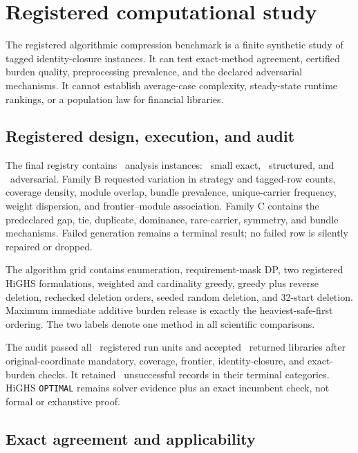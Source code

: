 \section{Registered computational study}
\label{sec:computational-study}
\label{sec:experiments}

The registered algorithmic compression benchmark is a finite synthetic study of
tagged identity-closure instances. It can test exact-method agreement, certified
burden quality, preprocessing prevalence, and the declared adversarial
mechanisms. It cannot establish average-case complexity, steady-state runtime
rankings, or a population law for financial libraries.

\subsection{Registered design, execution, and audit}

The final registry contains \AORBenchmarkInstances\ analysis instances:
\AORBenchmarkSmallExact\ small exact, \AORBenchmarkStructured\ structured,
and \AORBenchmarkAdversarial\ adversarial. Family B requested variation in
strategy and tagged-row counts, coverage density, module overlap, bundle
prevalence, unique-carrier frequency, weight dispersion, and
frontier--module association. Family C contains the predeclared gap, tie,
duplicate, dominance, rare-carrier, symmetry, and bundle mechanisms. Failed
generation remains a terminal result; no failed row is silently repaired or
dropped.

The algorithm grid contains enumeration, requirement-mask DP, two registered
HiGHS formulations, weighted and cardinality greedy, greedy plus reverse
deletion, rechecked deletion orders, seeded random deletion, and 32-start
deletion. Maximum immediate additive burden release is exactly the
heaviest-safe-first ordering. The two labels denote one method in all scientific comparisons.

The audit passed all \AORBenchmarkRuns\ registered run units and accepted
\AORBenchmarkAccepted\ returned libraries after original-coordinate mandatory,
coverage, frontier, identity-closure, and exact-burden checks. It retained
\AORBenchmarkUnsuccessful\ unsuccessful records in their terminal categories.
HiGHS \texttt{OPTIMAL} remains solver evidence plus an exact incumbent check,
not formal or exhaustive proof.

\subsection{Exact agreement and applicability}

